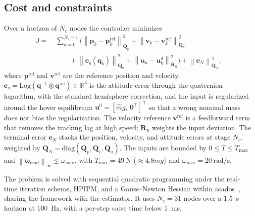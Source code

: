 \documentclass{ieeeaccess}
\newcommand{\R}{\mathbb{R}}
\newcommand{\norm}[1]{\left\| #1 \right\|}
\newcommand{\vect}[1]{\bm{#1}}
\newcommand{\mat}[1]{\mathbf{#1}}
\begin{document}
\subsection{Cost and constraints}
Over a horizon of $N_c$ nodes the controller minimizes
\begin{align}
J=\ &\sum_{k=0}^{N_c-1}\Big(
   \norm{\vect{p}_k-\vect{p}_k^{\text{ref}}}^2_{\mat{Q}_p}
  +\norm{\vect{v}_k-\vect{v}_k^{\text{ref}}}^2_{\mat{Q}_v}\nonumber\\
  &\qquad +\norm{\vect{e}_q(\vect{q}_k)}^2_{\mat{Q}_a}
  +\norm{\vect{u}_k-\vect{u}_k^0}^2_{\mat{R}_u}\Big)
  +\norm{\vect{e}_N}^2_{\mat{Q}_N},
\label{eq:nmpc-cost}
\end{align}
where $\vect{p}^{\text{ref}}$ and $\vect{v}^{\text{ref}}$ are the reference
position and velocity,
$\vect{e}_q=\mathrm{Log}(\vect{q}^{-1}\!\otimes\vect{q}^{\text{ref}})\in\R^3$ is
the attitude error through the quaternion logarithm, with the standard
hemisphere correction, and the input is regularized around the hover
equilibrium $\vect{u}^0=[\hat{m}g,\,\vect{0}^{\!\top}]^{\!\top}$ so that a wrong
nominal mass does not bias the regularization. The velocity reference
$\vect{v}^{\text{ref}}$ is a feedforward term that removes the tracking lag at
high speed; $\mat{R}_u$ weights the input deviation. The terminal error
$\vect{e}_N$ stacks the position, velocity, and attitude errors at stage $N_c$,
weighted by $\mat{Q}_N=\mathrm{diag}(\mat{Q}_p,\mat{Q}_v,\mat{Q}_a)$. The inputs
are bounded by
$0\leq T\leq T_{\max}$ and $\norm{\vect{\omega}_{\text{cmd}}}_\infty\leq\omega_{\max}$,
with $T_{\max}=\SI{49}{\newton}$ ($\approx4.8mg$) and
$\omega_{\max}=\SI{20}{\radian\per\second}$.

The problem is solved with sequential quadratic programming under the real-time
iteration scheme, HPIPM, and a Gauss--Newton Hessian within
acados~\cite{verschueren2022acados}, sharing the framework with the estimator. It
uses $N_c=31$ nodes over a \SI{1.5}{\second} horizon at \SI{100}{\hertz}, with a
per-step solve time below \SI{1}{\milli\second}.
\end{document}
